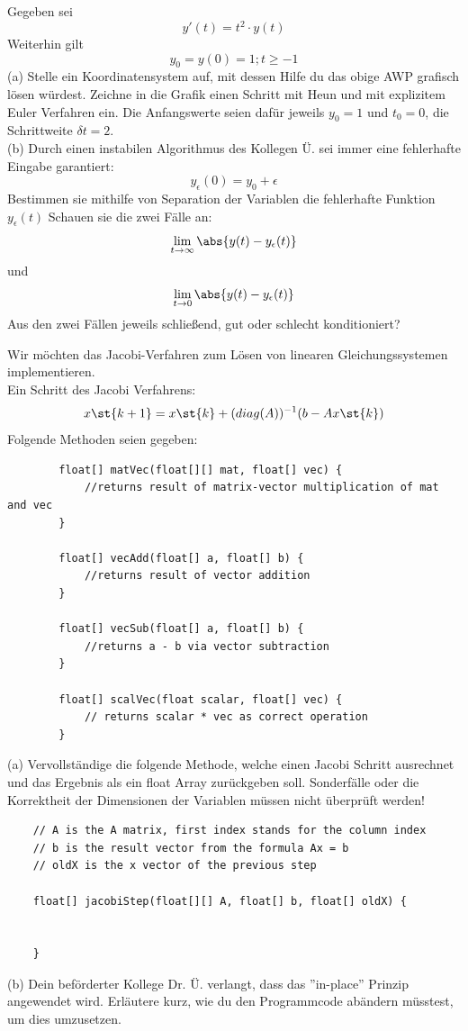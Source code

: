 \documentclass{scrartcl}
\begin{document}
	
	Gegeben sei 
	$$y'(t) = t^2 \cdot y(t)$$
	Weiterhin gilt $$y_0 = y(0) = 1; t \ge -1$$
	(a)
	Stelle ein Koordinatensystem auf, mit dessen Hilfe du das obige AWP grafisch lösen würdest. Zeichne in die Grafik einen Schritt mit Heun und mit explizitem Euler Verfahren ein. Die Anfangswerte seien dafür jeweils $y_0 = 1$ und $t_0 = 0$, die Schrittweite $\delta t = 2$.
	\lbreak \lbreak \lbreak \lbreak
	\\
	(b)
	Durch einen instabilen Algorithmus des Kollegen Ü. sei immer eine fehlerhafte Eingabe garantiert: $$y_\epsilon(0) = y_0 + \epsilon$$
	Bestimmen sie mithilfe von Separation der Variablen die fehlerhafte Funktion $y_\epsilon(t)$ \n
	Schauen sie die zwei Fälle an: $$\lim_{t \rightarrow \infty} \abs{y(t) - y_\epsilon(t)}$$ und $$\lim_{t \rightarrow 0} \abs{y(t) - y_\epsilon(t)}$$
	Aus den zwei Fällen jeweils schließend, gut oder schlecht konditioniert?
	


	Wir möchten das Jacobi-Verfahren zum Lösen von linearen Gleichungssystemen implementieren. \\
	Ein Schritt des Jacobi Verfahrens:
	$$x\st{k+1} = x\st{k} + (diag(A))^{-1}(b - Ax\st{k})$$
	Folgende Methoden seien gegeben:
	\begin{lstlisting}
		float[] matVec(float[][] mat, float[] vec) {
			//returns result of matrix-vector multiplication of mat and vec
		}
		
		float[] vecAdd(float[] a, float[] b) {
			//returns result of vector addition
		}
		
		float[] vecSub(float[] a, float[] b) {
			//returns a - b via vector subtraction
		}
		
		float[] scalVec(float scalar, float[] vec) {
			// returns scalar * vec as correct operation
		}
	\end{lstlisting}
	\newpage
	(a) Vervollständige die folgende Methode, welche einen Jacobi Schritt ausrechnet und das Ergebnis als ein float Array zurückgeben soll.
	\n 
	Sonderfälle oder die Korrektheit der Dimensionen der Variablen müssen nicht überprüft werden! \n 
	\begin{lstlisting}
	// A is the A matrix, first index stands for the column index
	// b is the result vector from the formula Ax = b
	// oldX is the x vector of the previous step
	
	float[] jacobiStep(float[][] A, float[] b, float[] oldX) {
		
		
	}
	\end{lstlisting}
	\lbreak
	(b) Dein beförderter Kollege Dr. Ü. verlangt, dass das ''in-place'' Prinzip angewendet wird. Erläutere kurz, wie du den Programmcode abändern müsstest, um dies umzusetzen.
\end{document}

